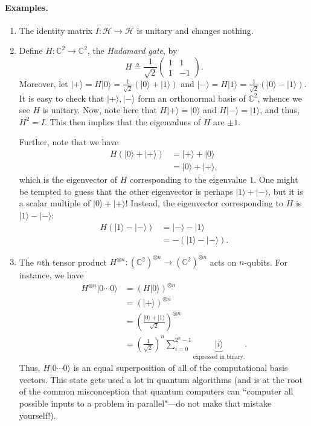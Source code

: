 \documentclass{article}
\newcommand{\ket}[1]{|#1\rangle}
\newcommand{\bbC}{\mathbb{C}}
\newcommand{\calH}{\mathcal{H}}
\begin{document}
\paragraph{Examples.}
\begin{enumerate}
    \item The identity matrix $I: \calH \to \calH$ is unitary and changes nothing.
    \item Define $H: \bbC^2 \to \bbC^2$, the {\em Hadamard gate}, by 
    \begin{equation}
        \label{eq: hadamard-gate}
        H \triangleq \frac{1}{\sqrt{2}} \begin{pmatrix}
            1 & 1 \\
            1 & -1
        \end{pmatrix}.
    \end{equation}
    Moreover, let $\ket{+} = H\ket{0} = \frac{1}{\sqrt{2}}(\ket{0} + \ket{1})$ and $\ket{-}= H\ket{1} = \frac{1}{\sqrt{2}} (\ket{0} - \ket{1})$. It is easy to check that $\ket{+}, \ket{-}$ form an orthonormal basis of $\bbC^2$, whence we see $H$ is unitary. Now, note here that $H\ket{+} = \ket{0}$ and $H\ket{-} = \ket{1}$, and thus, $H^2 = I$. This then implies that the eigenvalues of $H$ are $\pm 1$. 

    Further, note that we have 
    \begin{align*}
        H(\ket{0} + \ket{+}) &= \ket{+} + \ket{0} \\
        &= \ket{0} + \ket{+},
    \end{align*}
    which is the eigenvector of $H$ corresponding to the eigenvalue $1$. One might be tempted to guess that the other eigenvector is perhaps $\ket{1} + \ket{-}$, but it is a scalar multiple of $\ket{0} + \ket{+}$! Instead, the eigenvector corresponding to $H$ is $\ket{1} - \ket{-}$:
    \begin{align*}
        H(\ket{1} - \ket{-}) &= \ket{-} - \ket{1} \\
        &= -(\ket{1} - \ket{-}).
    \end{align*}
    \item The $n$th tensor product $H^{\otimes n}: (\bbC^2)^{\otimes n} \to (\bbC^2)^{\otimes n}$ acts on $n$-qubits. For instance, we have
    \begin{align*}
        H^{\otimes n}\ket{0 \cdots 0} 
        &= (H\ket{0})^{\otimes n} \\
        &= (\ket{+})^{\otimes n} \\
        &= \left(\frac{\ket{0} + \ket{1}}{\sqrt{2}}\right)^{\otimes n} \\
        &= \left(\frac{1}{\sqrt{2}}\right)^n \sum_{i= 0}^{2^n - 1} \underbrace{\ket{i}}_{\text{expressed in binary.}}.
    \end{align*} 
    Thus, $H\ket{0 \cdots 0}$ is an equal superposition of all of the computational basis vectors.  This state gets used a lot in quantum algorithms (and is at the root of the common misconception that quantum computers can ``computer all possible inputs to a problem in parallel"---do not make that mistake yourself!).
\end{enumerate}
\end{document}
